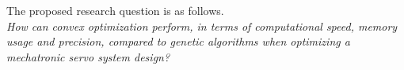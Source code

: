 The proposed research question is as follows.
\\

\textit{How can convex optimization perform, in terms of computational speed, memory usage and precision, compared to genetic algorithms when optimizing a mechatronic servo system design?}

